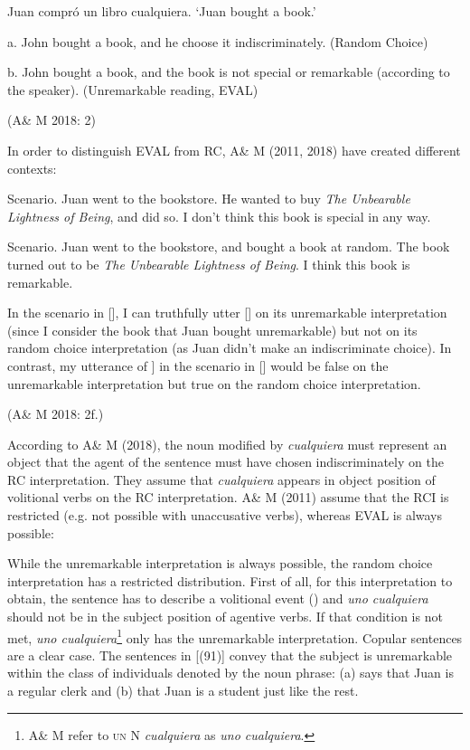 \documentclass[output=paper]{langscibook}
\begin{document}
\label{bkm:Ref533953640}  Juan compró un libro cualquiera. ‘Juan bought a book.’

  a.  John bought a book, and he choose it indiscriminately. (Random Choice)

  b.  John bought a book, and the book is not special or remarkable (according to the speaker). (Unremarkable reading, EVAL)

    (A\& M 2018: 2)

In order to distinguish EVAL from RC, A\& M (2011, 2018) have created different contexts:

\label{bkm:Ref54686706}  Scenario. Juan went to the bookstore. He wanted to buy \textit{The Unbearable Lightness of Being}, and did so. I don’t think this book is special in any way.

\label{bkm:Ref533953745}  Scenario. Juan went to the bookstore, and bought a book at random. The book turned out to be \textit{The Unbearable Lightness of Being}. I think this book is remarkable.

In the scenario in [], I can truthfully utter [] on its unremarkable interpretation (since I consider the book that Juan bought unremarkable) but not on its random choice interpretation (as Juan didn’t make an indiscriminate choice). In contrast, my utterance of ] in the scenario in [] would be false on the unremarkable interpretation but true on the random choice interpretation. 

(A\& M 2018: 2f.)

According to A\& M (2018), the noun modified by \textit{cualquiera} must represent an object that the agent of the sentence must have chosen indiscriminately on the RC interpretation. They assume that \textit{cualquiera} appears in object position of volitional verbs on the RC interpretation. A\& M (2011) assume that the RCI is restricted (e.g. not possible with unaccusative verbs), whereas EVAL is always possible:

While the unremarkable interpretation is always possible, the random choice interpretation has a restricted distribution. First of all, for this interpretation to obtain, the sentence has to describe a volitional event (\citealt{ChoiRomero2008}) and \textit{uno cualquiera} should not be in the subject position of agentive verbs. If that condition is not met, \textit{uno cualquiera}\footnote{ \textrm{A\& M refer to} \textsc{un}\textrm{ }\textrm{N}\textrm{ \textit{cualquiera}} \textrm{as} \textrm{\textit{uno cualquiera}}.} only has the unremarkable interpretation. Copular sentences are a clear case. The sentences in [(91)] convey that the subject is unremarkable within the class of individuals denoted by the noun phrase: (a) says that Juan is a regular clerk and (b) that Juan is a student just like the rest.
\end{document}
